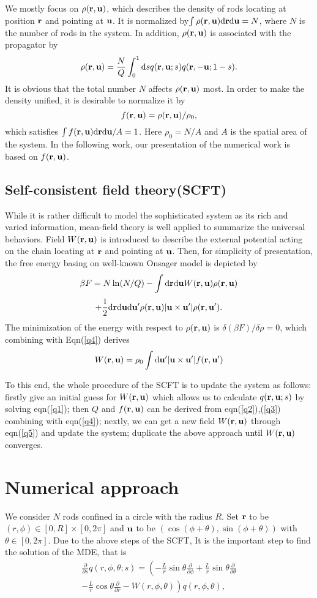 \documentclass[prl,twocolumn,preprintnumbers,reprint]{revtex4}
\newcommand{\bu}{{\bf u}}
\newcommand{\br}{{\bf r}}
\newcommand{\rd}{{\rm d}}
\newcommand{\be}{\begin{equation}}
\newcommand{\en}{\end{equation}}
\begin{document}
We mostly focus on $\rho(\br,\bu)$, which describes the density of rods locating at position $\br$ and pointing at $\bu$. It is normalized by$\int\rho(\br,\bu)\rd\br\rd\bu=N$, where $N$ is the number of rods in the system. In addition, $\rho(\br,\bu)$ is associated with the propagator by
\be \label{q3}
\rho(\br,\bu)=\frac{N}{Q}\int_0^1\rd s q(\br,\bu;s)q(\br,-\bu;1-s).
\en
It is obvious that the total number $N$ affects $\rho(\br,\bu)$ most. In order to make the density unified, it is desirable to normalize it by
\be \label{q4}
f(\br,\bu)=\rho(\br,\bu)/\rho_0,
\en
which satisfies $\int f(\br,\bu)\rd\br\rd\bu/A=1$. Here $\rho_0=N/A$ and $A$ is the spatial area of the system. In the following work, our presentation of the numerical work is based on $f(\br,\bu)$.

\subsection{Self-consistent field theory(SCFT) }
While it is rather difficult to model the sophisticated system as its rich and varied information, mean-field theory is well applied to summarize the universal behaviors. Field $W(\br,\bu)$ is introduced to describe the external potential acting on the chain locating at $\br$ and pointing at $\bu$. Then, for simplicity of presentation, the free energy basing on well-known Onsager model is depicted by
\[
\beta F=N\ln(N/Q)-\int\rd\br\rd\bu W(\br,\bu)\rho(\br,\bu)
\]
\be
+\frac{1}{2}\rd\br\rd\bu\rd\bu'\rho(\br,\bu)|\bu\times\bu'|\rho(\br,\bu').
\en
The minimization of the energy with respect to $\rho(\br,\bu)$ is $\delta (\beta F)/\delta\rho=0$, which combining with Eqn(\ref{q4}) derives
\be \label{q5}
W(\br,\bu)=\rho_0\int\rd\bu'|\bu\times\bu'|f(\br,\bu')
\en

To this end, the whole procedure of the SCFT is to update the system as follows:
firstly give an initial guess for $W(\br,\bu)$ which allows us to calculate $q(\br,\bu;s)$ by solving eqn(\ref{q1}); then $Q$ and $f(\br,\bu)$ can be derived from eqn(\ref{q2}),(\ref{q3}) combining with eqn(\ref{q4}); nextly, we can get a new field $W(\br,\bu)$ through eqn(\ref{q5}) and update the system; duplicate the above approach until $W(\br,\bu)$ converges.

\section{Numerical approach}
We consider $N$ rods confined in a circle with the radius $R$. Set $\br$ to be $(r,\phi)\in [0,R]\times[0,2\pi]$ and $\bu$ to be $(\cos(\phi+\theta),\sin(\phi+\theta))$ with $\theta\in[0,2\pi]$. Due to the above steps of the SCFT, It is the important step to find the solution of the MDE, that is
\begin{align}\label{MDE}
\frac{\partial}{\partial s}q(r,\phi,\theta;s)=\left(-\frac{L}{r}\sin\theta\frac{\partial}{\partial \phi}+\frac{L}{r}\sin\theta\frac{\partial}{\partial \theta}\right. \nonumber\\
\left.-\frac{L}{r}\cos\theta\frac{\partial}{\partial r}-W(r,\phi,\theta)\right)q(r,\phi,\theta),
\end{align}
\end{document}
